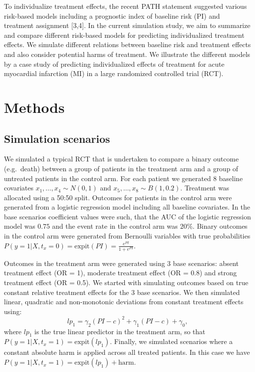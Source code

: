 \documentclass[]{elsarticle} %
\begin{document}
To individualize treatment effects, the recent PATH statement suggested
various risk-based models including a prognostic index of baseline risk
(PI) and treatment assignment {[}3,4{]}. In the current simulation
study, we aim to summarize and compare different risk-based models for
predicting individualized treatment effects. We simulate different
relations between baseline risk and treatment effects and also consider
potential harms of treatment. We illustrate the different models by a
case study of predicting individualized effects of treatment for acute
myocardial infarction (MI) in a large randomized controlled trial (RCT).

\hypertarget{methods}{%
\section{Methods}\label{methods}}

\hypertarget{simulation-scenarios}{%
\subsection{Simulation scenarios}\label{simulation-scenarios}}

We simulated a typical RCT that is undertaken to compare a binary
outcome (e.g.~death) between a group of patients in the treatment arm
and a group of untreated patients in the control arm. For each patient
we generated 8 baseline covariates \(x_1,\dots,x_4\sim N(0, 1)\) and
\(x_5,\dots,x_8\sim B(1, 0.2)\). Treatment was allocated using a 50:50
split. Outcomes for patients in the control arm were generated from a
logistic regression model including all baseline covariates. In the base
scenarios coefficient values were such, that the AUC of the logistic
regression model was \(0.75\) and the event rate in the control arm was
\(20\%\). Binary outcomes in the control arm were generated from
Bernoulli variables with true probabilities
\(P(y=1|X, t_x = 0) = \text{expit}(PI)=\frac{e^{PI}}{1+e^{PI}}\).

Outcomes in the treatment arm were generated using 3 base scenarios:
absent treatment effect (OR = 1), moderate treatment effect (OR = 0.8)
and strong treatment effect (OR = 0.5). We started with simulating
outcomes based on true constant relative treatment effects for the 3
base scenarios. We then simulated linear, quadratic and non-monotonic
deviations from constant treatment effects using:
\[lp_1 = \gamma_2(PI-c)^2 + \gamma_1(PI-c) + \gamma_0, \] where \(lp_1\)
is the true linear predictor in the treatment arm, so that
\(P(y=1|X, t_x=1) = \text{expit}(lp_1)\). Finally, we simulated
scenarios where a constant absolute harm is applied across all treated
patients. In this case we have
\(P(y=1|X,t_x=1) = \text{expit}(lp_1) + \text{harm}\).
\end{document}
